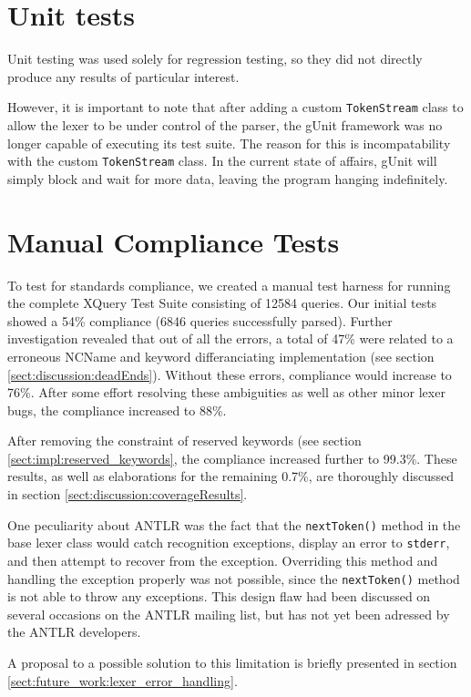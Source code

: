 \label{sect:results:tests}
\section{Unit tests}
\label{sect:results:tests:unit}
Unit testing was used solely for regression testing, so they did not directly 
produce any results of particular interest.

However, it is important to note that after adding a custom \verb!TokenStream! class to
allow the lexer to be under control of the parser, the gUnit framework was no
longer capable of executing its test suite. The reason for this is
incompatability with the custom \verb!TokenStream! class. In the current state of
affairs, gUnit will simply block and wait for more data, leaving the program
hanging indefinitely. 

\section{Manual Compliance Tests}
\label{sect:tests:manual}
To test for standards compliance, we created a manual test harness for running
the complete XQuery Test Suite\cite{w3c05} consisting of 12584 queries. Our
initial tests showed a 54\% compliance (6846 queries successfully parsed). Further
investigation revealed that out of all the errors, a total of 47\% were related
to a erroneous NCName and keyword differanciating implementation (see section
\ref{sect:discussion:deadEnds}). Without these errors, compliance would increase
to 76\%. After some effort resolving these ambiguities as well as other minor
lexer bugs, the compliance increased to 88\%.

After removing the constraint of reserved keywords (see section
\ref{sect:impl:reserved_keywords}, the compliance increased further to 99.3\%.
These results, as well as elaborations for the remaining 0.7\%, are thoroughly
discussed in section \ref{sect:discussion:coverageResults}.

One peculiarity about ANTLR was the fact that the \verb!nextToken()! method in
the base lexer class would catch recognition exceptions, display an error to \verb!stderr!, and
then attempt to recover from the exception. Overriding this method and handling
the exception properly was not possible, since the \verb!nextToken()! method is not
able to throw any exceptions. This design flaw had been discussed on
several occasions on the ANTLR mailing list\cite{antlrmail}, but has not yet
been adressed by the ANTLR developers.

A proposal to a possible solution to this limitation is briefly presented in
section \ref{sect:future_work:lexer_error_handling}.